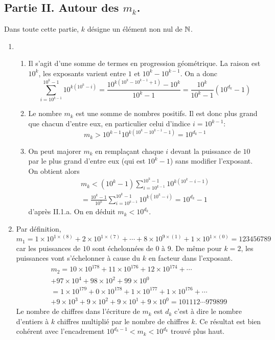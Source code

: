 \subsection*{Partie II. Autour des $m_k$.}
Dans toute cette partie, $k$ désigne un élément non nul de $\mathbb{N}$.
\begin{enumerate}
 \item
\begin{enumerate}
 \item Il s'agit d'une somme de termes en progression géométrique. La raison est $10^k$, les exposants varient entre $1$ et $10^k-10^{k-1}$. On a donc
\begin{displaymath}
 \sum_{i=10^{k-1}}^{10^k -1}10^{k(10^k -i)} 
=\frac{10^{k(10^k-10^{k-1}+1)}-10^k}{10^k - 1}
= \frac{10^k}{10^k -1}\left( 10^{d_k} - 1\right) 
\end{displaymath}
 \item Le nombre $m_k$ est une somme de nombres positifs. Il est donc plus grand que chacun d'entre eux, en particulier celui d'indice $i=10^{k-1}$:
\begin{displaymath}
 m_k > 10^{k-1}10^{k(10^{k}-10^{k-1}-1 ) }=10^{d_k -1}
\end{displaymath}

 \item On peut majorer $m_k$ en remplaçant chaque $i$ devant la puissance de $10$ par le plus grand d'entre eux (qui est $10^k-1$) sans modifier l'exposant. On obtient alors
\begin{multline*}
 m_k < (10^k - 1)\sum_{i=10^{k-1}}^{10^k -1}10^{k(10^k -i-1)}\\
= \frac{10^k - 1}{10^k}\sum_{i=10^{k-1}}^{10^k -1}10^{k(10^k -i)}
=10^{d_k}-1
\end{multline*}
d'après II.1.a. On en déduit $m_k < 10^{d_k}$.
\end{enumerate}

\item Par définition,
\begin{displaymath}
 m_1 = 1\times 10^{1\times(8)}+2\times 10^{1\times(7)}+\cdots+8\times 10^{9\times(1)}+1\times 10^{1\times(0)}
=123456789
\end{displaymath}
car les puissances de $10$ sont échelonnées de $0$ à $9$. De même pour $k=2$, les puissances vont s'échelonner à cause du $k$ en facteur dans l'exposant.
\begin{multline*}
 m_2 =
10\times 10^{178} + 11\times 10^{176} + 12\times 10^{174} +\cdots \\
+97\times 10^{4} + 98\times 10^{2} + 99\times 10^{0}\\
=1\times 10^{179}+0\times 10^{178}+ 1\times 10^{177}+ 1\times 10^{176}+\cdots \\
+9\times 10^{3} +9\times 10^{2}+ 9\times 10^{1} +9\times 10^{0}
=101112\cdots 979899
\end{multline*}
Le nombre de chiffres dans l'écriture de $m_k$ est $d_k$ c'est à dire le nombre d'entiers à $k$ chiffres multiplié par le nombre de chiffres $k$. Ce résultat est bien cohérent avec l'encadrement $10^{d_k -1}<m_k<10^{d_k}$ trouvé plus haut.


\end{enumerate}
